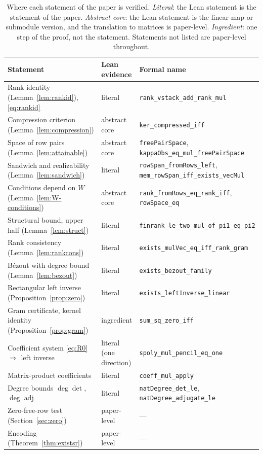 \documentclass[journal]{IEEEtran}
\theoremstyle{plainn}
\theoremstyle{remark}
\begin{document}
\begin{table}[!t]
\centering
\caption{Where each statement of the paper is verified. \emph{Literal}: the Lean statement is the
statement of the paper. \emph{Abstract core}: the Lean statement is the linear-map or submodule
version, and the translation to matrices is paper-level. \emph{Ingredient}: one step of the proof,
not the statement. Statements not listed are paper-level throughout.}
\label{tab:evidence}
\footnotesize
\begin{tabular}{@{}lll@{}}
\toprule
Statement & Lean evidence & Formal name \\
\midrule
Rank identity (Lemma~\ref{lem:rankid}), \eqref{eq:rankid} & literal &
\texttt{rank\_vstack\_add\_rank\_mul} \\
Compression criterion (Lemma~\ref{lem:compression}) & abstract core &
\texttt{ker\_compressed\_iff} \\
Space of row pairs (Lemma~\ref{lem:attainable}) & abstract core & \texttt{freePairSpace},
\texttt{kappaObs\_eq\_mul\_freePairSpace} \\
Sandwich and realizability (Lemma~\ref{lem:sandwich}) & literal &
\texttt{rowSpan\_fromRows\_left}, \texttt{mem\_rowSpan\_iff\_exists\_vecMul} \\
Conditions depend on $W$ (Lemma~\ref{lem:W-conditions}) & abstract core &
\texttt{rank\_fromRows\_eq\_rank\_iff}, \texttt{rowSpace\_eq} \\
Structural bound, upper half (Lemma~\ref{lem:struct}) & literal &
\texttt{finrank\_le\_two\_mul\_of\_pi1\_eq\_pi2} \\
Rank consistency (Lemma~\ref{lem:rankcons}) & literal &
\texttt{exists\_mulVec\_eq\_iff\_rank\_gram} \\
B\'ezout with degree bound (Lemma~\ref{lem:bezout}) & literal & \texttt{exists\_bezout\_family} \\
Rectangular left inverse (Proposition~\ref{prop:zero}) & literal &
\texttt{exists\_leftInverse\_linear} \\
Gram certificate, kernel identity (Proposition~\ref{prop:gram}) & ingredient &
\texttt{sum\_sq\_zero\_iff} \\
Coefficient system \eqref{eq:R0} $\Rightarrow$ left inverse & literal (one direction) &
\texttt{spoly\_mul\_pencil\_eq\_one} \\
Matrix-product coefficients & literal & \texttt{coeff\_mul\_apply} \\
Degree bounds $\deg\det$, $\deg\operatorname{adj}$ & literal &
\texttt{natDegree\_det\_le}, \texttt{natDegree\_adjugate\_le} \\
Zero-free-row test (Section~\ref{sec:zero}) & paper-level & --- \\
Encoding (Theorem~\ref{thm:existsr}) & paper-level & --- \\
\bottomrule
\end{tabular}
\end{table}
\end{document}

